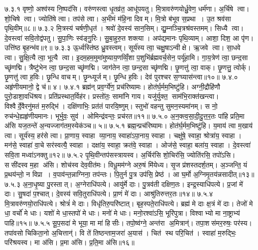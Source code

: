 \anuvakamend
७.३.१
वृष्णो॒ अश्व॑स्य नि॒ष्पद॑सि। वरु॑णस्त्वा धृ॒तव्र॑त॒ आधू॑पयतु। मि॒त्रावरु॑णयोर्ध्रु॒वेण॒ धर्म॑णा। अ॒र्चिषे त्वा। शो॒चिषे त्वा। ज्योति॑षे त्वा। तप॑से त्वा। अ॒भीमं म॑हि॒ना दिवम्। मि॒त्रो ब॑भूव स॒प्रथा। उ॒त श्रव॑सा पृथि॒वीम्॥८॥
७.३.२
मि॒त्रस्य॑ चर्\mbox{}षणी॒धृत॑। श्रवो॑ दे॒वस्य॑ सान॒सिम्। द्यु॒म्नञ्चि॒त्रश्र॑वस्तमम्। सिध्यै त्वा। दे॒वस्त्वा॑ सवि॒तोद्व॑पतु। सु॒पा॒णिः स्व॑ङ्गु॒रिः। सु॒बा॒हुरु॒त शक्त्या। अप॑द्यमानः पृथि॒व्याम्। आशा॒ दिश॒ आ पृ॑ण। उत्ति॑ष्ठ बृ॒हन्भ॑व॥९॥
७.३.३
ऊ॒र्ध्वस्ति॑ष्ठ ध्रु॒वस्त्वम्। सूर्य॑स्य त्वा॒ चक्षु॒षाऽन्वीक्षे। ऋ॒जवे त्वा। सा॒धवे त्वा। सु॒क्षि॒त्यै त्वा॒ भूत्यै त्वा। इ॒दम॒हम॒मुमा॑मुष्याय॒णव्विँ॒शा प॒शुभि॑र्ब्रह्मवर्च॒सेन॒ पर्यू॑हामि। गा॒य॒त्रेण॑ त्वा॒ छन्द॒सा च्छृ॑णद्मि। त्रैष्टु॑भेन त्वा॒ छन्द॒सा च्छृ॑णद्मि। जाग॑तेन त्वा॒ छन्द॒सा च्छृ॑णद्मि। छृ॒णत्तु॑ त्वा॒ वाक्। छृ॒णत्तु॒ त्वोर्क्। छृ॒णत्तु॑ त्वा ह॒विः। छृ॒न्धि वाचम्। छृ॒न्ध्यूर्जम्। छृ॒न्धि ह॒विः। देव॑ पुरश्चर स॒ग्घ्यास॑न्त्वा॥१०॥
७.४.०
अहृ॑णीयमानो॒ द्वे च॑॥ ४।
\anuvakamend
७.४.१
ब्रह्म॑न् प्रव॒र्ग्ये॑ण॒ प्रच॑रिष्यामः। होत॑र्घ॒र्मम॒भिष्टु॑हि। अग्नी॒द्रौहि॑णौ पुरो॒डाशा॒वधि॑श्रय। प्रति॑प्रस्थात॒र्विह॑र। प्रस्तो॑तः॒ सामा॑नि गाय। यजु॑र्युक्त॒ साम॑भि॒राक्त॑खन्त्वा। विश्वैर्दे॒वैरनु॑मतं म॒रुद्भि॑। दक्षि॑णाभिः॒ प्रत॑तं पारयि॒ष्णुम्। स्तुभो॑ वहन्तु सुमन॒स्यमा॑नम्। स नो॒ रुच॑न्धे॒ह्यहृ॑णीयमानः। भूर्भुवः॒ सुव॑। ओमिन्द्र॑वन्तः॒ प्रच॑रत॥११॥
७.५.०
अ॒न॒क्त्व॒सा॒दी॒दु॒त्त॒र॒तः पा॑हि प्रति॒मा अ॑सि यज॒तन्ते॑ अ॒न्यज्जाग॑तम॒स्येक॑ञ्च॥ ५॥
\anuvakamend
७.५.१
ब्रह्म॒न्प्रच॑रिष्यामः। होत॑र्घ॒र्मम॒भिष्टु॑हि। य॒माय॑ त्वा म॒खाय॑ त्वा। सूर्य॑स्य॒ हर॑से त्वा। प्रा॒णाय॒ स्वाहा व्या॒नाय॒ स्वाहा॑ऽपा॒नाय॒ स्वाहा। चक्षु॑षे॒ स्वाहा॒ श्रोत्रा॑य॒ स्वाहा। मन॑से॒ स्वाहा॑ वा॒चे सर॑स्वत्यै॒ स्वाहा। दक्षा॑य॒ स्वाहा॒ क्रत॑वे॒ स्वाहा। ओज॑से॒ स्वाहा॒ बला॑य॒ स्वाहा। दे॒वस्त्वा॑ सवि॒ता मध्वा॑ऽनक्तु॥१२॥
७.५.२
पृ॒थि॒वीन्तप॑सस्त्रायस्व। अ॒र्चिर॑सि शो॒चिर॑सि॒ ज्योति॑रसि॒ तपो॑ऽसि। ससी॑दस्व म॒हा अ॑सि। शोच॑स्व देव॒वीत॑मः। विधू॒मम॑ग्ने अरु॒षं मि॑येध्य। सृ॒ज प्र॑शस्तदर्\mbox{}श॒तम्। अ॒ञ्जन्ति॒ यं प्र॒थय॑न्तो॒ न विप्रा। व॒पाव॑न्त॒न्नाग्निना॒ तप॑न्तः। पि॒तुर्न पु॒त्र उप॑सि॒ प्रेष्ठ॑। आ घ॒र्मो अ॒ग्निमृ॒तय॑न्नसादीत्॥१३॥
७.५.३
अ॒ना॒धृ॒ष्या पु॒रस्तात्। अ॒ग्नेराधि॑पत्ये। आयु॑र्मे दाः। पु॒त्रव॑ती दक्षिण॒तः। इन्द्र॒स्याधि॑पत्ये। प्र॒जां मे॑ दाः। सु॒षदा॑ प॒श्चात्। दे॒वस्य॑ सवि॒तुराधि॑पत्ये। प्रा॒णं मे॑ दाः। आश्रु॑तिरुत्तर॒तः॥१४॥
७.५.४
मि॒त्रावरु॑णयो॒राधि॑पत्ये। श्रोत्रं॑ मे दाः। विधृ॑तिरु॒परि॑ष्टात्। बृह॒स्पते॒राधि॑पत्ये। ब्रह्म॑ मे दाः क्ष॒त्रं मे॑ दाः। तेजो॑ मे धा॒ वर्चो॑ मे धाः। यशो॑ मे धा॒स्तपो॑ मे धाः। मनो॑ मे धाः। मनो॒रश्वा॑ऽसि॒ भूरि॑पुत्रा। विश्वाभ्यो मा ना॒ष्ट्राभ्य॑ पाहि॥१५॥
७.५.५
सू॒प॒सदा॑ मे भूया॒ मा मा॑ हिसीः। तपो॒ष्व॑ग्ने॒ अन्त॑रा अ॒मित्रान्॑। तपा॒शस॑मर॒रुषः॒ पर॑स्य। तपा॑वसो चिकिता॒नो अ॒चित्तान्॑। वि ते॑ तिष्ठन्ताम॒जरा॑ अ॒यास॑। चित॑ स्थ परि॒चित॑। स्वाहा॑ म॒रुद्भिः॒ परि॑श्रयस्व। मा अ॑सि। प्र॒मा अ॑सि। प्र॒ति॒मा अ॑सि॥१६॥
